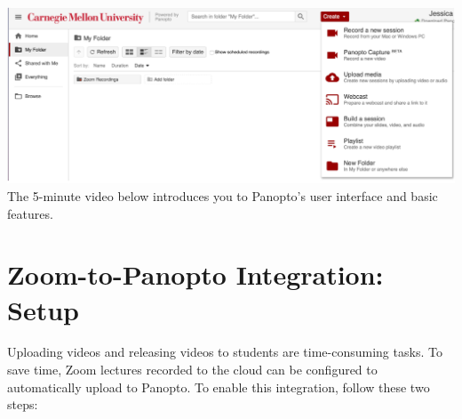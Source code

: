 \begin{gram}

{
\centering
\includegraphics[scale=0.5]{panopto/media/01-ui.png}
}
The 5-minute video below introduces you to Panopto’s user interface and basic features.

\end{gram}


\section{Zoom-to-Panopto Integration: Setup}
\label{sec:panopto:zoom_to_panopto_integration_set_up}

Uploading videos and releasing videos to students are time-consuming tasks. To save time, Zoom lectures recorded to the cloud can be configured to automatically upload to Panopto. To enable this integration, follow these two steps:

